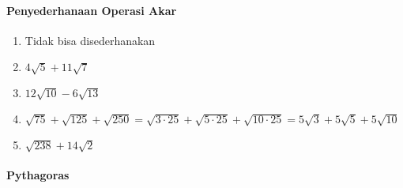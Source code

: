\documentclass[12pt,a4paper]{article}
\begin{document}
	\paragraph{Penyederhanaan Operasi Akar}
	\begin{enumerate}
		\item Tidak bisa disederhanakan
		\item $4\sqrt{5}+11\sqrt{7}$
		\item $12\sqrt{10}-6\sqrt{13}$
		\item $\sqrt{75}+\sqrt{125}+\sqrt{250}=\sqrt{3 \cdot 25} + \sqrt{5\cdot 25} + \sqrt{10\cdot 25}= 5\sqrt{3} + 5 \sqrt{5}+ 5\sqrt{10} $
		\item $\sqrt{238}+14\sqrt{2}$
	\end{enumerate}
	\paragraph{Pythagoras}
\end{document}
